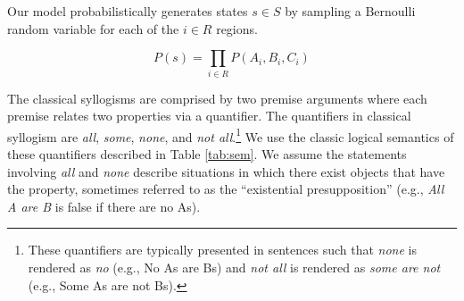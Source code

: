 \documentclass[floatsintext, doc]{apa6}
\begin{document}
Our model probabilistically generates states $s \in S$ by sampling a Bernoulli random variable for each of the $i \in R$ regions. 

$$P(s) = \prod_{i \in R} P(A_{i}, B_{i}, C_{i}) $$%

The classical syllogisms are comprised by two premise arguments where each premise relates two properties via a quantifier. 
The quantifiers in classical syllogism are \emph{all}, \emph{some}, \emph{none}, and \emph{not all}.\footnote{
These quantifiers are typically presented in sentences such that \emph{none} is rendered as \emph{no} (e.g., No As are Bs) and \emph{not all} is rendered as \emph{some are not} (e.g., Some As are not Bs).
}
We use the classic logical semantics of these quantifiers described in Table \ref{tab:sem}.
We assume the statements involving \emph{all} and \emph{none} describe situations in which there exist objects that have the property, sometimes referred to as the ``existential presupposition'' (e.g., \emph{All A are B} is false if there are no As). 



\end{document}
